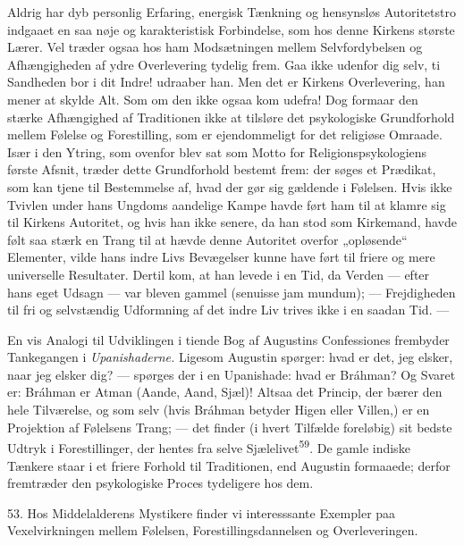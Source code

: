 \documentclass[12pt,a4paper,openany]{book}
\newcommand{\opage}[1]{\marginnote{\footnotesize\textit{[#1]}}}
\begin{document}
Aldrig har dyb personlig Erfaring, energisk Tænkning og hensynsløs
Autoritetstro indgaaet en saa nøje og karakteristisk Forbindelse, som
hos denne Kirkens største Lærer. Vel træder ogsaa hos ham Modsætningen
mellem Selvfordybelsen og Afhængigheden af ydre Overlevering tydelig
frem. Gaa ikke udenfor dig selv, ti Sandheden bor i dit Indre! udraaber
han. Men det er Kirkens Overlevering, han mener at skylde Alt. Som om
den ikke ogsaa kom udefra! Dog formaar den stærke Afhængighed af
Traditionen ikke at tilsløre det psykologiske Grundforhold mellem
Følelse og Forestilling, som er ejendommeligt for det religiøse Omraade.
Især i den Ytring, som ovenfor blev sat som Motto for
Religionspsykologiens første Afsnit, træder dette Grundforhold bestemt
frem: der søges et Prædikat, som kan tjene til Bestemmelse af, hvad der
gør sig gældende i Følelsen. Hvis ikke Tvivlen under hans Ungdoms
aandelige Kampe havde ført ham til at klamre sig til Kirkens Autoritet,
og hvis han ikke senere, da han stod som Kirkemand, havde følt saa stærk
en Trang til at hævde denne Autoritet overfor „opløsende“ Elementer,
vilde hans indre Livs Bevægelser kunne have ført til friere og mere
universelle Resultater. Dertil kom, at han levede i en Tid, da Verden
--- efter hans eget Udsagn --- var bleven gammel (senuisse jam mundum);
--- Frejdigheden til fri og selvstændig Udformning af det indre Liv
trives ikke i en saadan Tid. ---

En vis Analogi til Udviklingen i tiende Bog af Augustins Confessiones
frembyder Tankegangen i \textit{Upanishaderne.} Ligesom Augustin
spørger: hvad er det, jeg elsker, naar jeg elsker dig? --- spørges der i
en Upanishade: hvad er Bráhman? Og Svaret er: Bráhman er Atman (Aande,
Aand, Sjæl)! Altsaa det Princip, der bærer den hele Tilværelse, og som
selv (hvis Bráhman betyder
\opage{117}Higen eller Villen,) er en Projektion af Følelsens Trang; ---
det finder (i hvert Tilfælde foreløbig) sit bedste Udtryk i
Forestillinger, der hentes fra selve Sjælelivet\textsuperscript{59}. De
gamle indiske Tænkere staar i et friere Forhold til Traditionen, end
Augustin formaaede; derfor fremtræder den psykologiske Proces tydeligere
hos dem.

53. Hos Middelalderens Mystikere finder vi interesssante Exempler paa
Vexelvirkningen mellem Følelsen, Forestillingsdannelsen og
Overleveringen.
\end{document}
